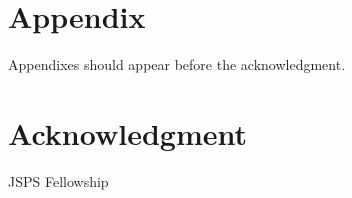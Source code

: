 \documentclass[letterpaper, 10 pt, conference]{ieeeconf}  %
\begin{document}






\section*{Appendix}

Appendixes should appear before the acknowledgment.

\section*{Acknowledgment}

JSPS Fellowship





\end{document}
